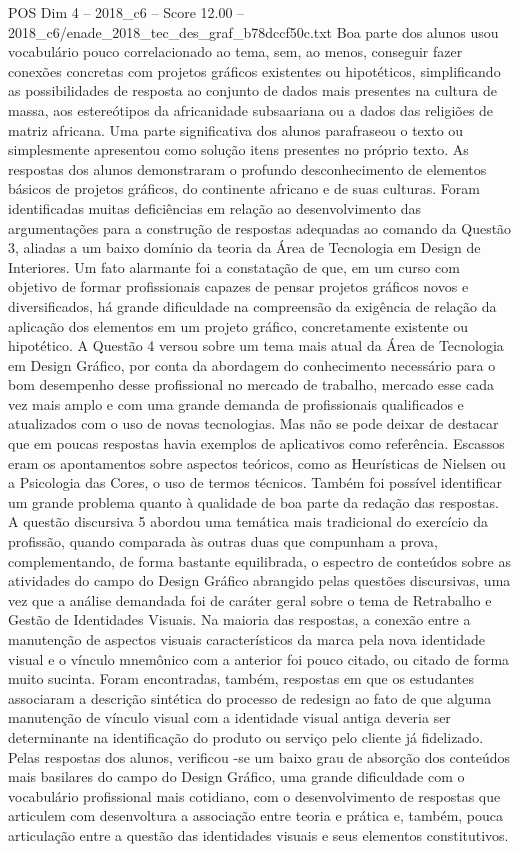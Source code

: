 \begin{textsample}{POS Dim 4 – 2018\_c6 – Score 12.00 – 2018\_c6/enade\_2018\_tec\_des\_graf\_b78dccf50c.txt}
Boa parte dos alunos usou vocabulário pouco correlacionado ao tema, sem, ao menos, conseguir fazer conexões concretas com projetos gráficos existentes ou hipotéticos, simplificando as possibilidades de resposta ao conjunto de dados mais presentes na cultura de massa, aos estereótipos da africanidade subsaariana ou a dados das religiões de matriz africana.
Uma parte significativa dos alunos parafraseou o texto ou simplesmente apresentou como solução itens presentes no próprio texto.
As respostas dos alunos demonstraram o profundo desconhecimento de elementos básicos de projetos gráficos, do continente africano e de suas culturas.
Foram identificadas muitas deficiências em relação ao desenvolvimento das argumentações para a construção de respostas adequadas ao comando da Questão 3, aliadas a um baixo domínio da teoria da Área de Tecnologia em Design de Interiores.
Um fato alarmante foi a constatação de que, em um curso com objetivo de formar profissionais capazes de pensar projetos gráficos novos e diversificados, há grande dificuldade na compreensão da exigência de relação da aplicação dos elementos em um projeto gráfico, concretamente existente ou hipotético.
A Questão 4 versou sobre um tema mais atual da Área de Tecnologia em Design Gráfico, por conta da abordagem do conhecimento necessário para o bom desempenho desse profissional no mercado de trabalho, mercado esse cada vez mais amplo e com uma grande demanda de profissionais qualificados e atualizados com o uso de novas tecnologias.
Mas não se pode deixar de destacar que em poucas respostas havia exemplos de aplicativos como referência.
Escassos eram os apontamentos sobre aspectos teóricos, como as Heurísticas de Nielsen ou a Psicologia das Cores, o uso de termos técnicos.
Também foi possível identificar um grande problema quanto à qualidade de boa parte da redação das respostas.
A questão discursiva 5 abordou uma temática mais tradicional do exercício da profissão, quando comparada às outras duas que compunham a prova, complementando, de forma bastante equilibrada, o espectro de conteúdos sobre as atividades do campo do Design Gráfico abrangido pelas questões discursivas, uma vez que a análise demandada foi de caráter geral sobre o tema de Retrabalho e Gestão de Identidades Visuais.
Na maioria das respostas, a conexão entre a manutenção de aspectos visuais característicos da marca pela nova identidade visual e o vínculo mnemônico com a anterior foi pouco citado, ou citado de forma muito sucinta.
Foram encontradas, também, respostas em que os estudantes associaram a descrição sintética do processo de redesign ao fato de que alguma manutenção de vínculo visual com a identidade visual antiga deveria ser determinante na identificação do produto ou serviço pelo cliente já fidelizado.
Pelas respostas dos alunos, verificou -se um baixo grau de absorção dos conteúdos mais basilares do campo do Design Gráfico, uma grande dificuldade com o vocabulário profissional mais cotidiano, com o desenvolvimento de respostas que articulem com desenvoltura a associação entre teoria e prática e, também, pouca articulação entre a questão das identidades visuais e seus elementos constitutivos.


\end{textsample}
